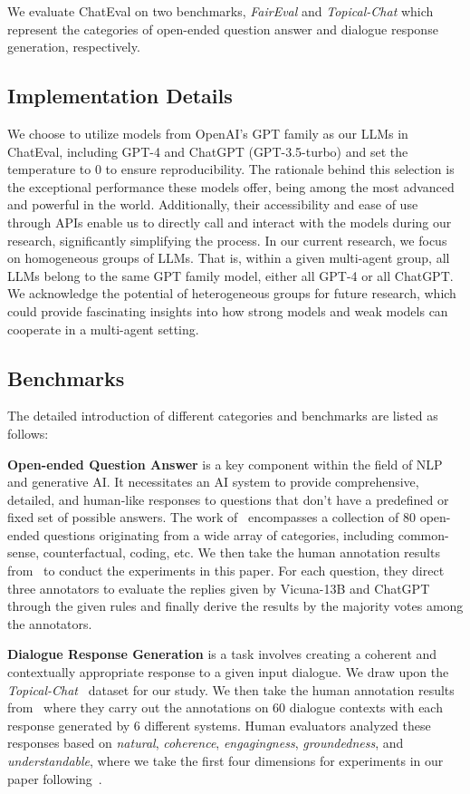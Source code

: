 

We evaluate ChatEval on two benchmarks, \textit{FairEval} and \textit{Topical-Chat} which represent the categories of open-ended question answer and dialogue response generation, respectively.


\subsection{Implementation Details}

We choose to utilize models from OpenAI's GPT family as our LLMs in ChatEval, including GPT-4 and ChatGPT (GPT-3.5-turbo) and set the temperature to 0 to ensure reproducibility. The rationale behind this selection is the exceptional performance these models offer, being among the most advanced and powerful in the world. Additionally, their accessibility and ease of use through APIs enable us to directly call and interact with the models during our research, significantly simplifying the process. In our current research, we focus on homogeneous groups of LLMs. That is, within a given multi-agent group, all LLMs belong to the same GPT family model, either all GPT-4 or all ChatGPT. We acknowledge the potential of heterogeneous groups for future research, which could provide fascinating insights into how strong models and weak models can cooperate in a multi-agent setting.

\subsection{Benchmarks}


The detailed introduction of different categories and benchmarks are listed as follows:

\textbf{Open-ended Question Answer} is a key component within the field of NLP and generative AI. It necessitates an AI system to provide comprehensive, detailed, and human-like responses to questions that don't have a predefined or fixed set of possible answers. The work of~\cite{chiang2023vicuna} encompasses a collection of 80 open-ended questions originating from a wide array of categories, including common-sense, counterfactual, coding, etc. We then take the human annotation results from~\cite{wu2023large} to conduct the experiments in this paper. For each question, they direct three annotators to evaluate the replies given by Vicuna-13B and ChatGPT through the given rules and finally derive the results by the majority votes among the annotators.


\textbf{Dialogue Response Generation} is a task involves creating a coherent and contextually appropriate response to a given input dialogue. We draw upon the \textit{Topical-Chat}~\citep{gopalakrishnan2019topical} dataset for our study. We then take the human annotation results from~\cite{mehri2020usr} where they carry out the annotations on 60 dialogue contexts with each response generated by 6 different systems. Human evaluators analyzed these responses based on \textit{natural}, \textit{coherence}, \textit{engagingness}, \textit{groundedness}, and \textit{understandable}, where we take the first four dimensions for experiments in our paper following~\cite{zhong2022towards}.


